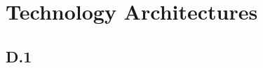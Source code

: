 \newpage\sloppy
\setlength{\RaggedRightRightskip}{0pt plus 2em}
\section{Technology Architectures}

\subsection{D.1}

\fussy
